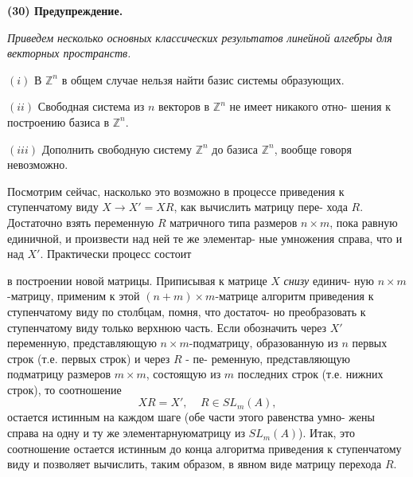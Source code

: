 	\noindent
	{\bf (30) Предупреждение.}
	
	{\it Приведем несколько основных классических результатов линейной\linebreak
	алгебры для векторных пространств.
	
	$(i)$ В ${\mathbb Z}^n$ в общем случае нельзя найти базис системы образующих.
	
	$(ii)$ Свободная система из $n$ векторов в ${\mathbb Z}^n$ не имеет никакого отно-\linebreak
	шения к построению базиса в ${\mathbb Z}^n$.
	
	$(iii)$ Дополнить свободную систему ${\mathbb Z}^n$ до базиса ${\mathbb Z}^n$, вообще говоря\linebreak
	невозможно.}

	Посмотрим сейчас, насколько это возможно в процессе приведения\linebreak
	к ступенчатому виду $X \rightarrow X' = XR$, как вычислить матрицу пере-\linebreak
	хода $R$. Достаточно взять переменную $R$ матричного типа размеров\linebreak
	$n\times m$, пока равную единичной, и произвести над ней те же элементар-\linebreak
	ные умножения справа, что и над $X'$. Практически процесс состоит\linebreak
	
	\pagebreak
	
	
	\noindent
	в построении новой матрицы. Приписывая к матрице $X$ {\it снизу} единич-\linebreak
	ную $n\times m$-матрицу, применим к этой $(n + m) \times m$-матрице алгоритм\linebreak
	приведения к ступенчатому виду по столбцам, помня, что достаточ-\linebreak
	но преобразовать к ступенчатому виду только верхнюю часть. Если\linebreak
	обозначить через $X'$ переменную, представляющую $n\times m$-подматрицу,\linebreak
	образованную из $n$ первых строк (т.е. первых строк) и через $R$ - пе-\linebreak
	ременную, представляющую подматрицу размеров $m\times m$, состоящую\linebreak
	из $m$ последних строк (т.е. нижних строк), то соотношение\linebreak
	$$XR = X', \ \ \ \ \ R \in SL_{m}(A),$$
	остается истинным на каждом шаге (обе части этого равенства умно-\linebreak
	жены справа на одну и ту же элементарнуюматрицу из $SL_{m}(A)$). Итак,\linebreak
	это соотношение остается истинным до конца алгоритма приведения к\linebreak
	ступенчатому виду и позволяет вычислить, таким образом, в явном\linebreak
	виде матрицу перехода $R$.
	
